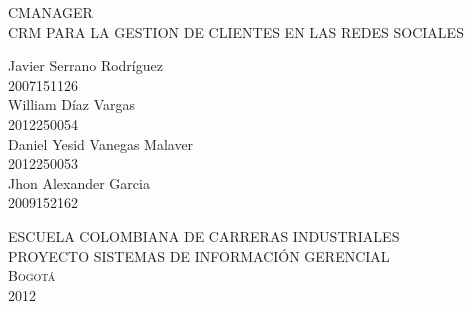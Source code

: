 \begin{titlepage}
\setlength{\parindent}{0pt} \setlength{\parskip}{0pt}

\begin{center}

\textsc{\large CMANAGER}\\[0.2cm]
{\large CRM PARA LA GESTION DE CLIENTES EN LAS REDES SOCIALES}\\[1cm]
\end{center}

\begin{center}

\end{center}

\begin{center}

\vfill
{\Large Javier Serrano Rodr\'iguez\\2007151126\\William D\'iaz Vargas\\2012250054\\Daniel Yesid Vanegas Malaver\\2012250053\\Jhon Alexander Garcia\\2009152162\\[0.4cm]}
\end{center}
\vfill
\begin{center}
\large \textsc{ESCUELA COLOMBIANA DE CARRERAS INDUSTRIALES\\PROYECTO SISTEMAS DE INFORMACI\'ON GERENCIAL\\Bogot\'a\\2012}
\end{center}
\end{titlepage}